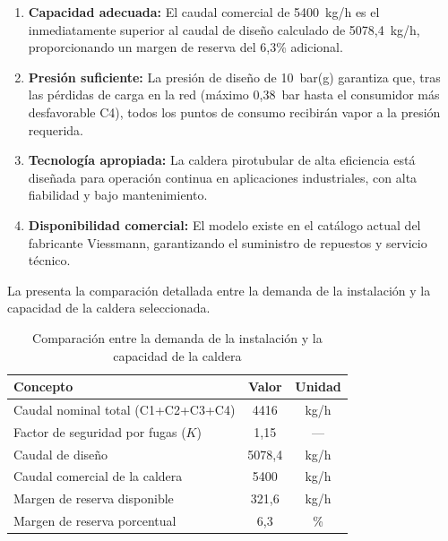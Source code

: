 \begin{enumerate}[label=\arabic*., leftmargin=2em]
	\item \textbf{Capacidad adecuada:} El caudal comercial de 5400~kg/h es el inmediatamente superior al caudal de diseño calculado de 5078,4~kg/h, proporcionando un margen de reserva del 6,3\% adicional.
	\item \textbf{Presión suficiente:} La presión de diseño de 10~bar(g) garantiza que, tras las pérdidas de carga en la red (máximo 0,38~bar hasta el consumidor más desfavorable C4), todos los puntos de consumo recibirán vapor a la presión requerida.
	\item \textbf{Tecnología apropiada:} La caldera pirotubular de alta eficiencia está diseñada para operación continua en aplicaciones industriales, con alta fiabilidad y bajo mantenimiento.
	\item \textbf{Disponibilidad comercial:} El modelo existe en el catálogo actual del fabricante Viessmann, garantizando el suministro de repuestos y servicio técnico.
\end{enumerate}

La  presenta la comparación detallada entre la demanda de la instalación y la capacidad de la caldera seleccionada.

\begin{table}[H]
	\centering
	\caption{Comparación entre la demanda de la instalación y la capacidad de la caldera}
	\label{tab:comparacion-demanda-caldera}
	\begin{tabular}{lcc}
		\toprule
		\textbf{Concepto}                   & \textbf{Valor} & \textbf{Unidad} \\
		\midrule
		Caudal nominal total (C1+C2+C3+C4)  & 4416           & kg/h            \\
		Factor de seguridad por fugas ($K$) & 1,15           & ---             \\
		Caudal de diseño                    & 5078,4         & kg/h            \\
		Caudal comercial de la caldera      & 5400           & kg/h            \\
		Margen de reserva disponible        & 321,6          & kg/h            \\
		Margen de reserva porcentual        & 6,3            & \%              \\
		\bottomrule
	\end{tabular}
\end{table}

